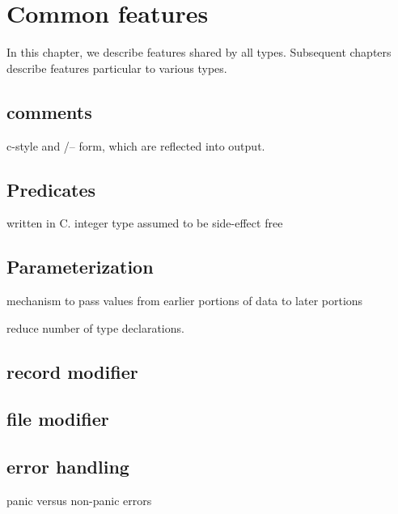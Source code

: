 \chapter{Common features}
In this chapter, we describe \padsl{} features shared by all types. 
Subsequent chapters describe features particular to various \padsl{}
types. 

\section{comments}
c-style and /-- form, which are reflected into output.

\section{Predicates}
 written in C. integer type
 assumed to be side-effect free

\section{Parameterization}
 mechanism to pass values from earlier portions of data to later
 portions
 
 reduce number of type declarations.

\section{record modifier}

\section{file modifier}

\section{error handling}
 panic versus non-panic errors